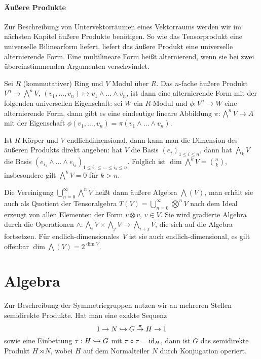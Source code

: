 \paragraph{Äußere Produkte} Zur Beschreibung von Untervektorräumen eines Vektorraums werden wir im nächsten Kapitel äußere Produkte benötigen. So wie das Tensorprodukt eine universelle Bilinearform liefert, liefert das äußere Produkt eine universelle alternierende Form. Eine multilineare Form heißt alternierend, wenn sie bei zwei übereinstimmenden Argumenten verschwindet.

\begin{defin}
Sei $R$ (kommutativer) Ring und $V$ Modul über $R$. Das $n$-fache äußere Produkt $V^n \to \bigwedge^n V$, $(v_1, \dots, v_n) \mapsto v_1 \wedge \dots \wedge v_n$, ist dann eine alternierende Form mit der folgenden universellen Eigenschaft: sei $W$ ein $R$-Modul und $\phi: V^n \to W$ eine alternierende Form, dann gibt es eine eindeutige lineare Abbildung $\pi: \bigwedge^n V \to A$ mit der Eigenschaft $\phi(v_1, \dots, v_n) = \pi(v_1 \wedge \dots \wedge v_n)$.
\end{defin}

Ist $R$ Körper und $V$ endlichdimensional, dann kann man die Dimension des äußeren Produkts direkt angeben: hat $V$ die Basis $(e_i)_{1 \leq i \leq n}$, dann hat $\bigwedge_k V$ die Basis $(e_{i_1} \wedge \dots \wedge e_{i_k})_{1 \leq i_1 \leq \dots \leq i_k \leq n}$. Folglich ist $\dim \bigwedge^k V = \binom nk$, insbesondere gilt $\bigwedge^k V = 0$ für $k > n$.

Die Vereinigung $\bigcup_{n=0}^\infty \bigwedge^n V$ heißt dann äußere Algebra $\bigwedge(V)$, man erhält sie auch als Quotient der Tensoralgebra $T(V) = \bigcup_{n=0}^\infty \bigotimes^n V$ nach dem Ideal erzeugt von allen Elementen der Form $v \otimes v$, $v \in V$. Sie wird gradierte Algebra durch die Operationen $\wedge: \bigwedge_i V \times \bigwedge_j V \to \bigwedge_{i+j} V$, die sich auf die Algebra fortsetzen. Für endlich-dimensionales~$V$ ist sie auch endlich-dimensional, es gilt offenbar $\dim \bigwedge(V) = 2^{\dim V}$.

\section{Algebra}
Zur Beschreibung der Symmetriegruppen nutzen wir an mehreren Stellen semidirekte Produkte. Hat man eine exakte Sequenz
\begin{equation}
1 \to N \into G \overrel\to^\pi H \to 1
\end{equation}
sowie eine Einbettung $\tau: H \hookrightarrow G$ mit $\pi \circ \tau = \operatorname{id}_H$, dann ist $G$ das semidirekte Produkt $H \rtimes N$, wobei $H$ auf dem Normalteiler $N$ durch Konjugation operiert.

